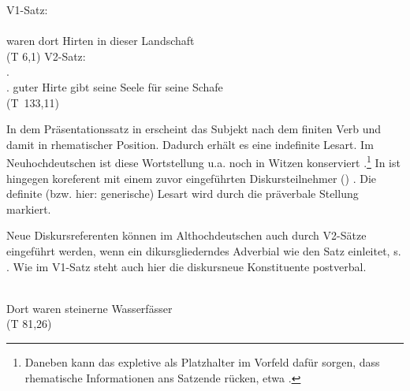 \begin{exe}
	\ex \label{ex:ahd-is}   
	\begin{xlist}
		\ex \label{ex:ahd-is-indef} V1-Satz:\\
		\gll {}        \\
		waren dort Hirten in dieser Landschaft\\
	\trans {} 
	(T 6,1)
	\ex \label{ex:ahd-is-def} V2-Satz:\\
		.         \\
		[Ich bin guter Hirte]. guter Hirte gibt seine Seele für seine Schafe\\
	\trans {} (T~133,11)

		\end{xlist}
\end{exe}

\noindent
In dem Präsentationssatz in  erscheint das Subjekt  nach dem finiten Verb  und damit in rhematischer Position. Dadurch erhält es eine indefinite Lesart. Im Neuhochdeutschen ist diese Wortstellung u.a. noch in Witzen konserviert \parencite[, vgl.][83]{Ramers2005}.\footnote{Daneben kann das expletive  als Platzhalter im Vorfeld dafür sorgen, dass rhematische Informationen ans Satzende rücken, etwa  \parencite[s. z.B.][]{Hauenschild1993}.} In  ist  hingegen koreferent mit einem zuvor eingeführten Diskursteilnehmer () \parencite[vgl. auch][]{Solf2008}. Die definite (bzw. hier: generische) Lesart wird durch die präverbale Stellung markiert.  

Neue Diskursreferenten können im Althochdeutschen auch durch V2-Sätze eingeführt werden, wenn ein dikursgliederndes Adverbial wie    den Satz einleitet, s.  \parencite[vgl.][152]{Hinterholzl2005}. Wie im V1-Satz steht auch hier die diskursneue Konstituente postverbal. 

\begin{exe} 
\ex \label{ex:v2-tho} 
\gll {}    \\
	Dort waren steinerne Wasserfässer \\
	\trans {} (T 81,26)
\end{exe}

